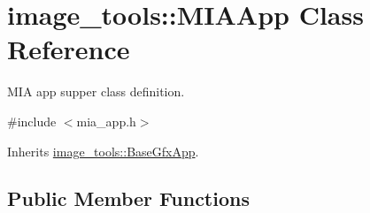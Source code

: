 \hypertarget{classimage__tools_1_1MIAApp}{}\section{image\+\_\+tools\+:\+:M\+I\+A\+App Class Reference}
\label{classimage__tools_1_1MIAApp}


M\+IA app supper class definition.  




{\ttfamily \#include $<$mia\+\_\+app.\+h$>$}



Inherits \hyperlink{classimage__tools_1_1BaseGfxApp}{image\+\_\+tools\+::\+Base\+Gfx\+App}.

\subsection*{Public Member Functions}
